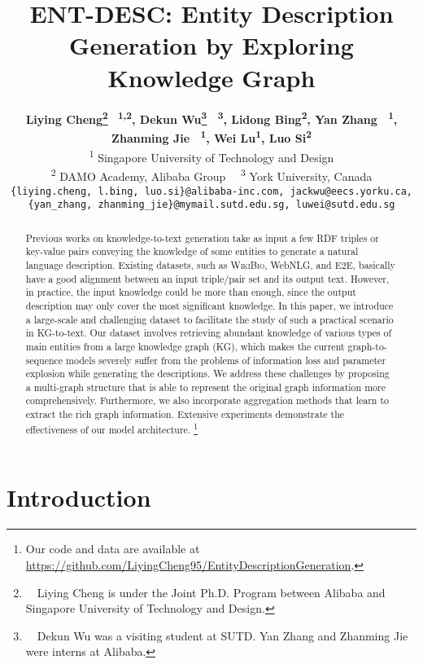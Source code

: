 \documentclass[11pt,a4paper]{article}
\title{ENT-DESC: Entity Description Generation by Exploring \\Knowledge Graph}
\author{ 
\textbf{
Liying Cheng\thanks{~~Liying Cheng is under the Joint Ph.D. Program between Alibaba and Singapore University of Technology and Design.} \textsuperscript{\rm ~1,2},
Dekun Wu\thanks{~~Dekun Wu was a visiting student at SUTD. Yan Zhang and Zhanming Jie were interns at Alibaba.}\textsuperscript{\rm ~~3},
Lidong Bing\textsuperscript{\rm 2},
Yan Zhang\footnotemark[2]\textsuperscript{\rm ~~1},
Zhanming Jie\footnotemark[2]\textsuperscript{\rm ~~1},
Wei Lu\textsuperscript{\rm 1},
Luo Si\textsuperscript{\rm 2}}\\
\textsuperscript{\rm 1} Singapore University of Technology and Design\\
\textsuperscript{\rm 2} DAMO Academy, Alibaba Group~~
\textsuperscript{\rm 3} York University, Canada \\
{\small \tt \{liying.cheng, l.bing, luo.si\}@alibaba-inc.com, 
jackwu@eecs.yorku.ca,} \\
{\small \tt \{yan\_zhang, zhanming\_jie\}@mymail.sutd.edu.sg, luwei@sutd.edu.sg}
}
\date{}
\begin{document}
\maketitle
\begin{abstract}
Previous works on knowledge-to-text generation take as input a few RDF triples or key-value pairs conveying the knowledge of some entities to generate a natural language description.
Existing datasets, such as W\textsc{iki}B\textsc{io}, WebNLG, and E2E, basically have a good alignment between an input triple/pair set and its output text. 
However, in practice, the input knowledge could be more than enough, since the output description may only cover the most significant knowledge. 
In this paper, we introduce a large-scale and challenging dataset to facilitate the study of such a practical scenario in KG-to-text.
Our dataset involves retrieving abundant knowledge of various types of main entities from a large knowledge graph (KG), which makes the current graph-to-sequence models severely suffer from the problems of information loss and parameter explosion while generating the descriptions.
We address these challenges by proposing a multi-graph structure that is able to represent the original graph information more comprehensively.
Furthermore, we also incorporate aggregation methods that learn to extract the rich graph information.
Extensive experiments demonstrate the effectiveness of our model architecture.
\footnote{Our code and data are available at \url{https://github.com/LiyingCheng95/EntityDescriptionGeneration}.}





\end{abstract}



\section{Introduction}
\end{document}
